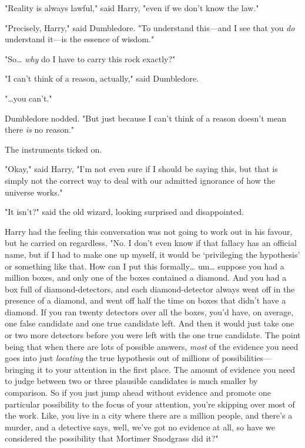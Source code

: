 "Reality is always lawful," said Harry, "even if we don't know the law."

"Precisely, Harry," said Dumbledore. "To understand this---and I see that you
\emph{do} understand it---is the essence of wisdom."

"So{\ldots} \emph{why} do I have to carry this rock exactly?"

"I can't think of a reason, actually," said Dumbledore.

"{\ldots}you can't."

Dumbledore nodded. "But just because I can't think of a reason doesn't mean
there \emph{is} no reason."

The instruments ticked on.

"Okay," said Harry, "I'm not even sure if I should be saying this, but that is
simply not the correct way to deal with our admitted ignorance of how the
universe works."

"It isn't?" said the old wizard, looking surprised and disappointed.

Harry had the feeling this conversation was not going to work out in his
favour, but he carried on regardless. "No. I don't even know if that fallacy
has an official name, but if I had to make one up myself, it would be
`privileging the hypothesis' or something like that. How can I put this
formally{\ldots} um{\ldots} suppose you had a million boxes, and only one of
the boxes contained a diamond. And you had a box full of diamond-detectors, and
each diamond-detector always went off in the presence of a diamond, and went
off half the time on boxes that didn't have a diamond. If you ran twenty
detectors over all the boxes, you'd have, on average, one false candidate and
one true candidate left. And then it would just take one or two more detectors
before you were left with the one true candidate. The point being that when
there are lots of possible answers, \emph{most} of the evidence you need goes
into just \emph{locating} the true hypothesis out of millions of
possibilities---bringing it to your attention in the first place. The amount of
evidence you need to judge between two or three plausible candidates is much
smaller by comparison. So if you just jump ahead without evidence and promote
one particular possibility to the focus of your attention, you're skipping over
most of the work. Like, you live in a city where there are a million people,
and there's a murder, and a detective says, well, we've got no evidence at all,
so have we considered the possibility that Mortimer Snodgrass did it?"

